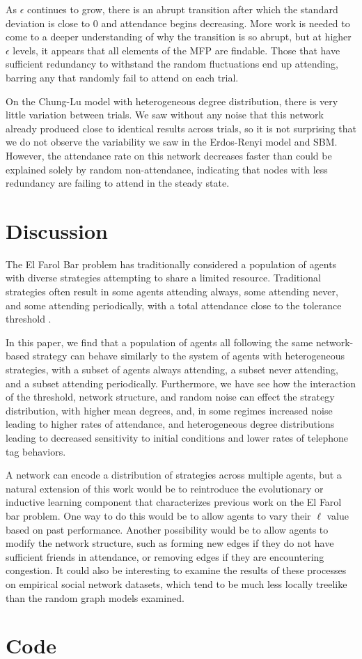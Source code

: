 \documentclass[12pt]{article}
\begin{document}
As $\epsilon$ continues to grow, there is an abrupt transition after which the standard deviation is close to 0 and attendance begins decreasing.  More work is needed to come to a deeper understanding of why the transition is so abrupt, but at higher $\epsilon$ levels, it appears that all elements of the MFP are findable.  Those that have sufficient redundancy to withstand the random fluctuations end up attending, barring any that randomly fail to attend on each trial.

On the Chung-Lu model with heterogeneous degree distribution, there is very little variation between trials.  We saw without any noise that this network already produced close to identical results across trials, so it is not surprising that we do not observe the variability we saw in the Erdos-Renyi model and SBM.  However, the attendance rate on this network decreases faster than could be explained solely by random non-attendance, indicating that nodes with less redundancy are failing to attend in the steady state. 

\section{Discussion}

The El Farol Bar problem has traditionally considered a population of agents with diverse strategies attempting to share a limited resource.  Traditional strategies often result in some agents attending always, some attending never, and some attending periodically, with a total attendance close to the tolerance threshold\cite{arthur:1994} \cite{stLuce:2020}.

In this paper, we find that a population of agents all following the same network-based strategy can behave similarly to the system of agents with heterogeneous strategies, with a subset of agents always attending, a subset never attending, and a subset attending periodically.  Furthermore, we have see how the interaction of the threshold, network structure, and random noise can effect the strategy distribution, with higher mean degrees, and, in some regimes increased noise leading to higher rates of attendance, and heterogeneous degree distributions leading to decreased sensitivity to initial conditions and lower rates of telephone tag behaviors.

A network can encode a distribution of strategies across multiple agents, but a natural extension of this work would be to reintroduce the evolutionary or inductive learning component that characterizes previous work on the El Farol bar problem.  One way to do this would be to allow agents to vary their $\ell$ value based on past performance.  Another possibility would be to allow agents to modify the network structure, such as forming new edges if they do not have sufficient friends in attendance, or removing edges if they are encountering congestion.  It could also be interesting to examine the results of these processes on empirical social network datasets, which tend to be much less locally treelike than the random graph models examined.    

\section*{Code}
\end{document}
